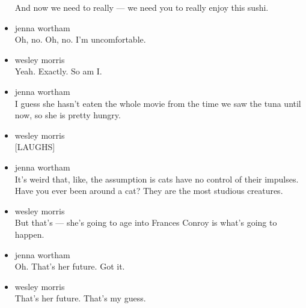 \begin{itemize}
  And now we need to really --- we need you to really enjoy this sushi.
\item
  jenna wortham\\
  Oh, no. Oh, no. I'm uncomfortable.
\item
  wesley morris\\
  Yeah. Exactly. So am I.
\item
  jenna wortham\\
  I guess she hasn't eaten the whole movie from the time we saw the tuna
  until now, so she is pretty hungry.
\item
  wesley morris\\
  {[}LAUGHS{]}
\item
  jenna wortham\\
  It's weird that, like, the assumption is cats have no control of their
  impulses. Have you ever been around a cat? They are the most studious
  creatures.
\item
  wesley morris\\
  But that's --- she's going to age into Frances Conroy is what's going
  to happen.
\item
  jenna wortham\\
  Oh. That's her future. Got it.
\item
  wesley morris\\
  That's her future. That's my guess.


\end{itemize}
